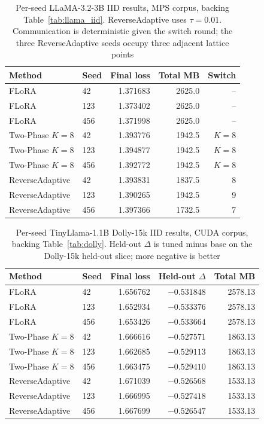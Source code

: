 \begin{table}[tbp]
\centering
\footnotesize
\setlength{\tabcolsep}{6pt}
\caption{Per-seed LLaMA-3.2-3B IID results, MPS corpus, backing Table~\ref{tab:llama_iid}. ReverseAdaptive uses $\tau{=}0.01$. Communication is deterministic given the switch round; the three ReverseAdaptive seeds occupy three adjacent lattice points}
\label{tab:b3}
\begin{tabular}{@{}llrrr@{}}
\toprule
Method & Seed & Final loss & Total MB & Switch \\
\midrule
FLoRA & 42 & 1.371683 & 2625.0 & -- \\
FLoRA & 123 & 1.373402 & 2625.0 & -- \\
FLoRA & 456 & 1.371998 & 2625.0 & -- \\
Two-Phase $K{=}8$ & 42 & 1.393776 & 1942.5 & $K{=}8$ \\
Two-Phase $K{=}8$ & 123 & 1.394877 & 1942.5 & $K{=}8$ \\
Two-Phase $K{=}8$ & 456 & 1.392772 & 1942.5 & $K{=}8$ \\
ReverseAdaptive & 42 & 1.393831 & 1837.5 & 8 \\
ReverseAdaptive & 123 & 1.390265 & 1942.5 & 9 \\
ReverseAdaptive & 456 & 1.397366 & 1732.5 & 7 \\
\bottomrule
\end{tabular}
\end{table}

\begin{table}[tbp]
\centering
\footnotesize
\setlength{\tabcolsep}{6pt}
\caption{Per-seed TinyLlama-1.1B Dolly-15k IID results, CUDA corpus, backing Table~\ref{tab:dolly}. Held-out $\Delta$ is tuned minus base on the Dolly-15k held-out slice; more negative is better}
\label{tab:b4}
\begin{tabular}{@{}llrrr@{}}
\toprule
Method & Seed & Final loss & Held-out $\Delta$ & Total MB \\
\midrule
FLoRA & 42 & 1.656762 & $-0.531848$ & 2578.13 \\
FLoRA & 123 & 1.652934 & $-0.533376$ & 2578.13 \\
FLoRA & 456 & 1.653426 & $-0.533664$ & 2578.13 \\
Two-Phase $K{=}8$ & 42 & 1.666616 & $-0.527571$ & 1863.13 \\
Two-Phase $K{=}8$ & 123 & 1.662685 & $-0.529113$ & 1863.13 \\
Two-Phase $K{=}8$ & 456 & 1.663475 & $-0.529410$ & 1863.13 \\
ReverseAdaptive & 42 & 1.671039 & $-0.526568$ & 1533.13 \\
ReverseAdaptive & 123 & 1.666995 & $-0.527418$ & 1533.13 \\
ReverseAdaptive & 456 & 1.667699 & $-0.526547$ & 1533.13 \\
\bottomrule
\end{tabular}
\end{table}

